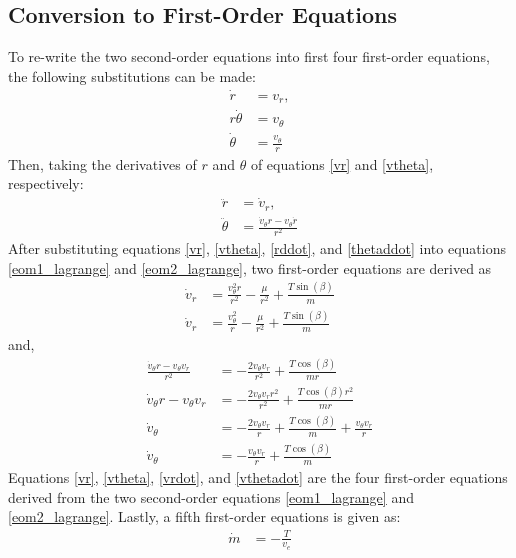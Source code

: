 \documentclass[]{article}
\begin{document}
\subsection{Conversion to First-Order Equations}
To re-write the two second-order equations into first four first-order equations, the following substitutions can be made:
\begin{align}
	\dot{r}       &= v_r,     \label{vr} \\
	r\dot{\theta} &= v_\theta  \nonumber \\
	\dot{\theta}  &= \frac{v_\theta}{r} \label{vtheta}
\end{align}
Then, taking the derivatives of \(r\) and \(\theta\) of equations \ref{vr} and \ref{vtheta}, respectively:
\begin{align}
	\ddot{r}      &= \dot{v}_r,  \label{rddot} \\
	\ddot{\theta} &= \frac{\dot{v}_{\theta}r - v_{\theta}\dot{r}}{r^2} \label{thetaddot}
\end{align}
After substituting equations \ref{vr}, \ref{vtheta}, \ref{rddot}, and \ref{thetaddot} into equations \ref{eom1_lagrange} and \ref{eom2_lagrange}, two first-order equations are derived as
\begin{align}
    \dot{v}_r     &= \frac{v^2_{\theta}r}{r^2} - \frac{\mu}{r^2} + \frac{T\sin(\beta)}{m}                      \nonumber \\
    \dot{v}_r     &= \frac{v^2_{\theta}}{r} - \frac{\mu}{r^2} + \frac{T\sin(\beta)}{m}                         \label{vrdot}
\end{align}
and,
\begin{align}
	\frac{\dot{v}_{\theta}r - v_{\theta}v_r}{r^2} &= -\frac{2v_{\theta}v_r}{r^2}   + \frac{T\cos(\beta)}{mr}   \nonumber\\
	\dot{v}_{\theta}r - v_{\theta}v_r &= -\frac{2v_{\theta}v_{r}r^2}{r^2}   + \frac{T\cos(\beta)r^2}{mr}       \nonumber\\
	\dot{v}_\theta &= -\frac{2v_{\theta}v_{r}}{r}   + \frac{T\cos(\beta)}{m} + \frac{v_{\theta}v_r}{r}         \nonumber\\
	\dot{v}_\theta &= -\frac{v_{\theta}v_{r}}{r}   + \frac{T\cos(\beta)}{m} \label{vthetadot}
\end{align}
Equations \ref{vr}, \ref{vtheta}, \ref{vrdot}, and \ref{vthetadot} are the four first-order equations derived from the two second-order equations \ref{eom1_lagrange} and \ref{eom2_lagrange}. Lastly, a fifth first-order equations is given as:
\begin{align}
	\dot{m} &= -\frac{T}{v_e} \label{massflowrate}
\end{align}
\end{document}
